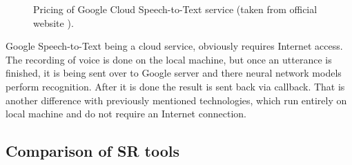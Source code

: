 \begin{figure}[hbt!]
    \centering
    \caption{Pricing of Google Cloud Speech-to-Text service (taken from official website \cite{CloudSpeech2019}).}
    \label{fig:cloudSpeechPricing}
\end{figure}

Google Speech-to-Text being a cloud service, obviously requires Internet access. The recording of voice is done on the local machine, but once an utterance is finished, it is being sent over to Google server and there neural network models perform recognition. After it is done the result is sent back via callback. That is another difference with previously mentioned technologies, which run entirely on local machine and do not require an Internet connection.

\subsection{Comparison of SR tools}

